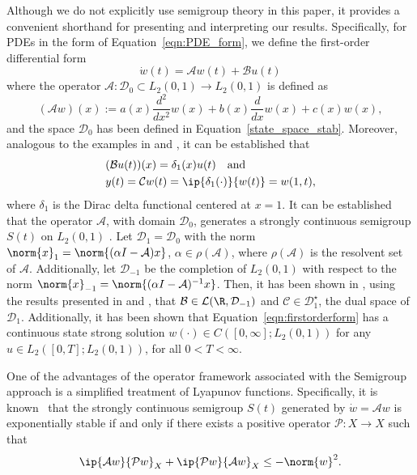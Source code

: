 \documentclass[9pt,journal,twocolumn]{IEEEtran}
\newcommand{\lt}{L_2(0,1)}
\newcommand{\mcl}[1]{\mathcal{#1}}
\begin{document}
Although we do not explicitly use semigroup theory in this paper, it provides a convenient shorthand for presenting and interpreting our results. Specifically, for PDEs in the form of Equation~\eqref{eqn:PDE_form}, we define the first-order differential form
\begin{equation}
\dot w(t) = \mathcal{A}w(t)+\mathcal{B}u(t) \label{eqn:firstorderform}
\end{equation}
where the operator $\mcl{A}:\mcl{D}_0 \subset \lt \rightarrow \lt$ is defined as
\begin{equation}
(\mathcal{A}w)(x):= a(x)\frac{d^2}{dx^2}w(x)+b(x)\frac{d}{dx}w(x)+c(x)w(x)\label{eqn:Aoperator},
\end{equation} and the space $\mcl{D}_0$ has been defined in Equation~\eqref{state_space_stab}.
Moreover, analogous to the examples in \cite{van1993h} and \cite{byrnes1999example}, it can be established that
\begin{align*}
&(\mathcal{B}u(t))(x)=\delta_1(x)u(t) \quad \text{and} \\
& y(t)=\mcl{C}w(t)=\ip{\delta_1(\cdot)}{w(t)}=w(1,t),
\end{align*} where $\delta_1$ is the Dirac delta functional centered at $x=1$. It can be established that the operator $\mcl{A}$, with domain $\mcl{D}_0$, generates a strongly continuous semigroup $S(t)$ on $\lt$ \cite{curtain1995introduction}. Let $\mcl{D}_1=\mcl{D}_0$ with the norm $\norm{x}_1=\norm{(\alpha I -\mcl{A})x}$, $\alpha \in \rho(\mcl{A})$, where $\rho(\mcl{A})$ is the resolvent set of $\mcl{A}$. Additionally, let $\mcl{D}_{-1}$ be the completion of $\lt$ with respect to the norm $\norm{x}_{-1}=\norm{(\alpha I -\mcl{A})^{-1}x}$. Then, it has been shown in \cite{harkort2011discrete}, using the results presented in \cite{nagel2000one} and \cite{weiss1989representation}, that $\mcl{B} \in \mcl{L}(\R,\mcl{D}_{-1})$ and $\mcl{C} \in \mcl{D}_1^\star$, the dual space of $\mcl{D}_1$. Additionally, it has been shown that Equation~\eqref{eqn:firstorderform} has a continuous state strong solution $w(\cdot) \in C([0,\infty];\lt)$ for any $u \in L_2([0,T];\lt)$, for all $0 < T <\infty$.  

One of the advantages of the operator framework associated with the Semigroup approach is a simplified treatment of Lyapunov functions. Specifically, it is known~\cite{curtain1995introduction} that the strongly continuous semigroup $S(t)$ generated by $\dot{w}=\mathcal{A}w$ is exponentially stable if and only if there exists a positive operator $\mathcal{P}:X\rightarrow X$ such that
\begin{equation}
\ip{\mathcal{A}w}{\mathcal{P}w}_X+\ip{\mathcal{P}w}{\mathcal{A}w}_X\le -\norm{w}^2.\label{eqn:lyapunov_LOI}
\end{equation}
\end{document}
